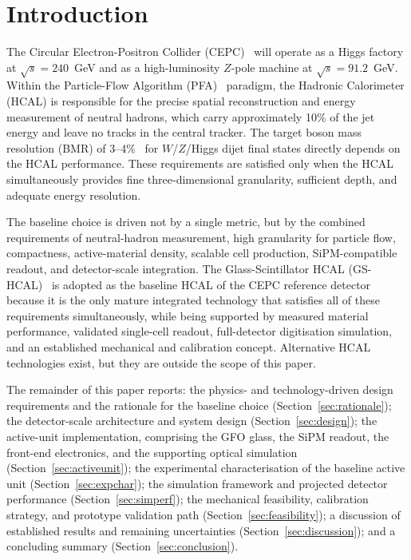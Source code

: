 
\section{Introduction}
\label{sec:intro}

The Circular Electron-Positron Collider
(CEPC)~\cite{CEPCStudyGroup:2018ghi} will operate as a Higgs factory at
$\sqrt{s}=240$~GeV and as a high-luminosity $Z$-pole machine at
$\sqrt{s}=91.2$~GeV.
Within the Particle-Flow Algorithm
(PFA)~\cite{Thomson:2009rp,Brient:2004yq,Ruan:2013rkk} paradigm, the
Hadronic Calorimeter (HCAL) is responsible for the precise spatial
reconstruction and energy measurement of neutral hadrons, which carry
approximately 10\% of the jet energy and leave no tracks in the central
tracker.
The target boson mass resolution (BMR) of
3--4\%~\cite{CEPCStudyGroup:2018ghi} for $W$/$Z$/Higgs dijet final
states directly depends on the HCAL performance.
These requirements are satisfied only when the HCAL simultaneously
provides fine three-dimensional granularity, sufficient depth, and
adequate energy resolution.

The baseline choice is driven not by a single metric, but by the
combined requirements of neutral-hadron measurement, high granularity
for particle flow, compactness, active-material density, scalable cell
production, SiPM-compatible readout, and detector-scale integration.
The Glass-Scintillator HCAL
(GS-HCAL)~\cite{Tang:2022yrb,Hu:2023dbm,Hu:2024nvo} is adopted as the
baseline HCAL of the CEPC reference detector because it is the only
mature integrated technology that satisfies all of these requirements
simultaneously, while being supported by measured material performance,
validated single-cell readout, full-detector digitisation simulation,
and an established mechanical and calibration concept.
Alternative HCAL technologies exist, but they are outside the scope of
this paper.

The remainder of this paper reports:
the physics- and technology-driven design requirements and the
rationale for the baseline choice (Section~\ref{sec:rationale});
the detector-scale architecture and system design
(Section~\ref{sec:design});
the active-unit implementation, comprising the GFO glass, the SiPM
readout, the front-end electronics, and the supporting optical
simulation (Section~\ref{sec:activeunit});
the experimental characterisation of the baseline active unit
(Section~\ref{sec:expchar});
the simulation framework and projected detector performance
(Section~\ref{sec:simperf});
the mechanical feasibility, calibration strategy, and prototype
validation path (Section~\ref{sec:feasibility});
a discussion of established results and remaining uncertainties
(Section~\ref{sec:discussion});
and a concluding summary (Section~\ref{sec:conclusion}).

